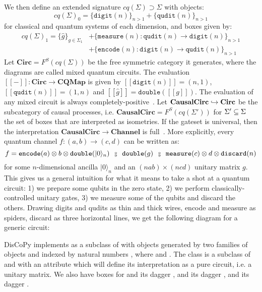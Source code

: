 We then define an extended signature $cq(\Sigma) \supset \Sigma$ with objects:
$$cq(\Sigma)_0 = \{ \mathtt{digit}(n) \}_{n > 1} + \{ \mathtt{qudit}(n) \}_{n > 1}$$
for classical and quantum systems of each dimension, and boxes given by:
\begin{align*}
cq(\Sigma)_1 = \{ \hat{g} \}_{g \in \Sigma_1}
&+ \{ \mathtt{measure}(n) : \mathtt{qudit}(n) \to \mathtt{digit}(n) \}_{n > 1}\\
&+ \{ \mathtt{encode}(n) : \mathtt{digit}(n) \to \mathtt{qudit}(n) \}_{n > 1}
\end{align*}
Let $\mathbf{Circ} = F^S(cq(\Sigma))$ be the free symmetric category it generates, where the diagrams are called mixed quantum circuits.
The evaluation $[\![-]\!] : \mathbf{Circ} \to \mathbf{CQMap}$ is given by
$[\![\mathtt{digit}(n)]\!] = (n, 1)$, $[\![\mathtt{qudit}(n)]\!] = (1, n)$ and
$[\![\hat{g}]\!] = \mathtt{double}([\![g]\!])$.
The evaluation of any mixed circuit is always completely-positive~\cite[Corollary~8.6]{CoeckeKissinger17}.
Let $\mathbf{CausalCirc} \hookrightarrow \mathbf{Circ}$ be the subcategory of causal processes, i.e. $\mathbf{CausalCirc} = F^S(cq(\Sigma'))$ for $\Sigma' \subseteq \Sigma$ the set of boxes that are interpreted as isometries.
If the gateset is universal, then the interpretation $\mathbf{CausalCirc} \to \mathbf{Channel}$ is full~\cite[Theorem~8.96]{CoeckeKissinger17}.
More explicitly, every quantum channel $f : (a, b) \to (c, d)$ can be written as:
$$f = \mathtt{encode}(a) \otimes b \otimes \mathtt{double}(\vert 0 \rangle_n)
\s \fcmp \s \mathtt{double}(g) \s \fcmp \s
\mathtt{measure}(c) \otimes d \otimes \mathtt{discard}(n)$$
for some $n$-dimensional ancilla $\vert 0 \rangle_n$ and an $(n a b) \times (n c d)$ unitary matrix $g$.
This gives us a general intuition for what it means to take a shot at a quantum circuit: 1) we prepare some qubits in the zero state, 2) we perform classically-controlled unitary gates, 3) we measure some of the qubits and discard the others.
Drawing digits and qudits as thin and thick wires, encode and measure as spiders, discard as three horizontal lines, we get the following diagram for a generic circuit:

DisCoPy implements  as a subclass of  with objects generated by two families of objects  and  indexed by natural numbers , where  and .
The class  is a subclass of  and  with an attribute  which will define its interpretation as a pure circuit, i.e. a unitary matrix.
We also have boxes for  and its dagger ,  and its dagger ,  and its dagger .

